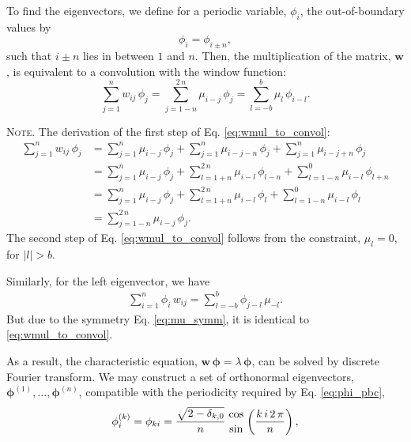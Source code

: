 \documentclass[preprint, superscriptaddress, floatfix]{revtex4-1}
\newcommand{\note}[1]{{\color{DarkGreen}\footnotesize \textsc{Note.} #1}}
\begin{document}
To find the eigenvectors,
we define for a periodic variable, $\phi_i$,
the out-of-boundary values by
%
\begin{equation}
  \phi_i = \phi_{i \pm n},
\label{eq:phi_pbc}
\end{equation}
%
such that $i \pm n$ lies in between $1$ and $n$.
%
Then, the multiplication of the matrix, $\mathbf w$,
is equivalent to a convolution with the window function:
%
\begin{equation}
  \sum_{ j = 1 }^n
    w_{ij} \, \phi_j
  =
  \sum_{ j = 1 - n }^{ 2 \, n }
    \mu_{i - j} \, \phi_j
  =
  \sum_{ l = -b }^{ b }
    \mu_l \, \phi_{ i - l}
  .
\label{eq:wmul_to_convol}
\end{equation}
%
\note{The derivation of the first step of
  Eq. \eqref{eq:wmul_to_convol}:
\begin{align*}
  \sum_{j = 1}^n
    w_{ij} \, \phi_j
  &=
  \sum_{j = 1}^n
    \mu_{i - j} \, \phi_j
  +
  \sum_{j = 1}^n
    \mu_{i - j - n} \, \phi_j
  +
  \sum_{j = 1}^n
    \mu_{i - j + n} \, \phi_j
  \\
  &=
  \sum_{j = 1}^n
    \mu_{i - j} \, \phi_j
  +
  \sum_{l = 1+n}^{2 \, n}
    \mu_{i - l} \, \phi_{l - n}
  +
  \sum_{l = 1-n}^0
    \mu_{i - l} \, \phi_{l + n}
  \\
  &=
  \sum_{j = 1}^n
    \mu_{i - j} \, \phi_j
  +
  \sum_{l = 1+n}^{2 \, n}
    \mu_{i - l} \, \phi_{l}
  +
  \sum_{l = 1-n}^0
    \mu_{i - l} \, \phi_{l}
  \\
  &=
  \sum_{j = 1-n}^{2 \, n}
    \mu_{i - j} \, \phi_j
  .
\end{align*}
The second step of Eq. \eqref{eq:wmul_to_convol}
follows from the constraint, $\mu_l = 0$, for $|l| > b$.

Similarly,
for the left eigenvector, we have
\begin{align*}
  \sum_{ i = 1 }^n
    \phi_i \, w_{ij}
  =
  \sum_{ l = -b }^b
    \phi_{j - l} \, \mu_{-l}
  .
\end{align*}
But due to the symmetry Eq. \eqref{eq:mu_symm},
it is identical to \eqref{eq:wmul_to_convol}.
}
%
As a result, the characteristic equation,
$\mathbf w \, \pmb\phi = \lambda \, \pmb\phi$,
can be solved by discrete Fourier transform.
%
We may construct a set of orthonormal eigenvectors,
$\pmb\phi^{(1)}, \dots, \pmb\phi^{(n)}$,
compatible with the periodicity
required by Eq. \eqref{eq:phi_pbc},
%
\begin{equation}
  \phi^{(k)}_i
  =
  \phi_{ki}
  =
  \frac{ \sqrt{ 2 - \delta_{k,0} } } { n }
  \,
  {\cos \atop \sin}
  \left(
    \frac{ k \, i \, 2 \, \pi }
         {      n             }
  \right)
  ,
  \notag
\end{equation}
\end{document}

